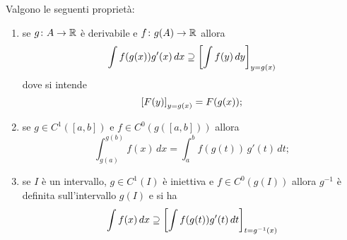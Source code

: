 \begin{theorem}
Valgono le seguenti proprietà:
\begin{enumerate}
\item
se $g\colon A \to {\mathbb R}$ è derivabile e $f\colon g(A) \to {\mathbb R}$
allora
%
%
%
\begin{equation}\label{eq:sostituzione_1}
  \int f(g(x)) g'(x)\, dx \supseteq
  {\left[ \int f(y) \, dy \right]}_{y=g(x)}
\end{equation}
dove si intende
\[
 {\left[ F(y) \right]}_{y=g(x)} = F(g(x));
\]

\item
se $g\in C^1([a,b])$ e $f\in C^0(g([a,b]))$ allora
%
%
%
\begin{equation}\label{eq:sostituzione_2}
 \int_{g(a)}^{g(b)} f(x)\, dx = \int_a^b f(g(t))\, g'(t)\, dt;
\end{equation}

\item
se $I$ è un intervallo, $g\in C^1(I)$ è iniettiva e $f\in C^0(g(I))$
allora $g^{-1}$ è definita sull'intervallo $g(I)$
e si ha
%
%
%
\begin{equation}\label{eq:239455}
  \int f(x)\, dx \supseteq {\left[ \int f(g(t)) g'(t)\, dt \right]}_{t=g^{-1}(x)}
\end{equation}
\end{enumerate}
\end{theorem}
%
